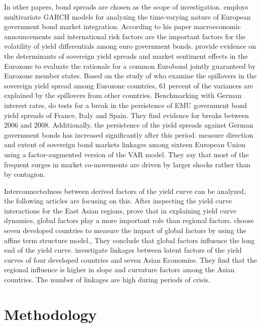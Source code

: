 \documentclass[12pt,bibliography=totoc]{article}
\begin{document}
In other papers, bond spreads are chosen as the scope of investigation.
\cite{balli2009spillover} employs multivariate GARCH models for analyzing the time-varying nature of European government bond market integration. According to his paper macroeconomic announcements and international risk factors are the important factors for the volatility of yield differentials among euro government bonds.
\cite{favero2012sovereign} provide evidence on the determinants of sovereign yield spreads and market sentiment effects in the Eurozone to evaluate the rationale for a common Eurobond jointly guaranteed by Eurozone member states. 
Based on the study of \cite{antonakakis2013sovereign} who examine the spillovers in the sovereign yield spread among Eurozone countries, 61 percent of the variances are explained by the spillovers from other countries. 
Benchmarking with German interest rates, \cite{sibbertsen2014testing} do tests for a break in the persistence of EMU government bond yield spreads of France, Italy and Spain. They find evidence for breaks between 2006 and 2008. Additionally, the persistence of the yield spreads against German government bonds has increased significantly after this period. 
\cite{claeys2014measuring} measure direction and extent of sovereign bond markets linkages among sixteen European Union using a factor-augmented version of the VAR model. They say that most of the frequent surges in market co-movements are driven by larger shocks rather than by contagion.


Interconnectedness between derived factors of the yield curve can be analyzed, the following articles are focusing on this.
After inspecting the yield curve interactions for the East Asian regions, \cite{bae2011global} prove that in explaining yield curve dynamics, global factors play a more important role than regional factors.
\cite{abbritti2013global} choose seven developed countries to measure the impact of global factors by using the affine term structure model., They conclude that global factors influence the long end of the yield curve. 
\cite{sowmya2016linkages} investigate linkages between latent factors of the yield curves of four developed countries and seven Asian Economies. They find that the regional influence is higher in slope and curvature factors among the Asian countries. The number of linkages
are high during periods of crisis.

\newpage

\section{Methodology}
\noindent
\end{document}
